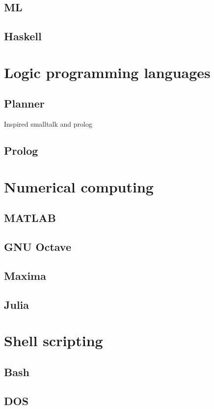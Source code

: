 \subsection{ML}
\subsection{Haskell}


\section{Logic programming languages}
\subsection{Planner}
Inspired smalltalk and prolog
\subsection{Prolog}


\section{Numerical computing}
\subsection{MATLAB}
\subsection{GNU Octave}
\subsection{Maxima}
\subsection{Julia}

\section{Shell scripting}
\subsection{Bash}
\subsection{DOS}

